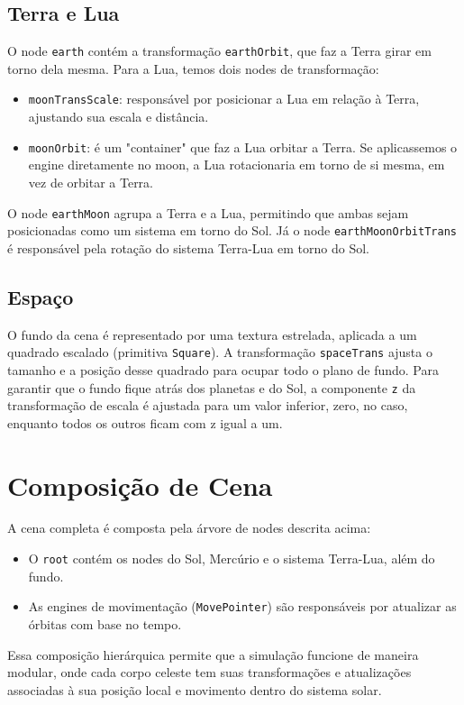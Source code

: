 \documentclass[11pt, a4paper]{article}
\begin{document}
\subsection{Terra e Lua}
O node \texttt{earth} contém a transformação \texttt{earthOrbit}, que faz a 
Terra girar em torno dela mesma. Para a Lua, temos dois nodes de transformação:

\begin{itemize}
\item \texttt{moonTransScale}: responsável por posicionar a Lua em relação à Terra, 
ajustando sua escala e distância.
\item \texttt{moonOrbit}: é um "container" que faz a Lua orbitar a Terra. Se
aplicassemos o engine diretamente no moon, a Lua rotacionaria em 
torno de si mesma, em vez de orbitar a Terra.
\end{itemize}

O node \texttt{earthMoon} agrupa a Terra e a Lua, permitindo que ambas sejam 
posicionadas como um sistema em torno do Sol. Já o node 
\texttt{earthMoonOrbitTrans} é responsável pela rotação do sistema Terra-Lua em 
torno do Sol.

\subsection{Espaço}
O fundo da cena é representado por uma textura estrelada, aplicada a um quadrado 
escalado (primitiva \texttt{Square}). A transformação \texttt{spaceTrans} ajusta 
o tamanho e a posição desse quadrado para ocupar todo o plano de fundo. Para 
garantir que o fundo fique atrás dos planetas e do Sol, a componente \texttt{z} 
da transformação de escala é ajustada para um valor inferior, zero, no caso,
enquanto todos os outros ficam com z igual a um.

\section {Composição de Cena}

A cena completa é composta pela árvore de nodes descrita acima:

\begin{itemize}
\item O \texttt{root} contém os nodes do Sol, Mercúrio e o sistema Terra-Lua, além 
do fundo.
\item As engines de movimentação (\texttt{MovePointer}) são responsáveis por 
atualizar as órbitas com base no tempo.
\end{itemize}

Essa composição hierárquica permite que a simulação funcione de maneira modular, 
onde cada corpo celeste tem suas transformações e atualizações associadas à sua 
posição local e movimento dentro do sistema solar.
\end{document}
